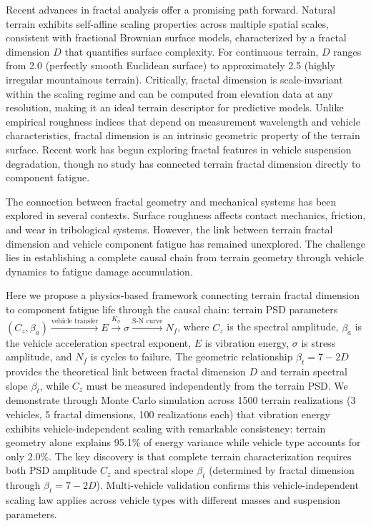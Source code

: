\documentclass[11pt]{article}
\begin{document}
Recent advances in fractal analysis offer a promising path forward. Natural terrain exhibits self-affine scaling properties across multiple spatial scales\cite{Mandelbrot1982,Sayles1978,Persson2005}, consistent with fractional Brownian surface models\cite{MandelbrotVanNess1968,Mandelbrot1982}, characterized by a fractal dimension $D$ that quantifies surface complexity. For continuous terrain, $D$ ranges from 2.0 (perfectly smooth Euclidean surface) to approximately 2.5 (highly irregular mountainous terrain). Critically, fractal dimension is scale-invariant within the scaling regime and can be computed from elevation data at any resolution, making it an ideal terrain descriptor for predictive models. Unlike empirical roughness indices that depend on measurement wavelength and vehicle characteristics, fractal dimension is an intrinsic geometric property of the terrain surface. Recent work has begun exploring fractal features in vehicle suspension degradation\cite{Braut2023}, though no study has connected terrain fractal dimension directly to component fatigue.

The connection between fractal geometry and mechanical systems has been explored in several contexts. Surface roughness affects contact mechanics, friction, and wear in tribological systems\cite{Persson2005}. However, the link between terrain fractal dimension and vehicle component fatigue has remained unexplored. The challenge lies in establishing a complete causal chain from terrain geometry through vehicle dynamics to fatigue damage accumulation.

Here we propose a physics-based framework connecting terrain fractal dimension to component fatigue life through the causal chain: terrain PSD parameters $(C_z, \beta_a) \xrightarrow{\text{vehicle transfer}} E \xrightarrow{K_\sigma} \sigma \xrightarrow{\text{S-N curve}} N_f$, where $C_z$ is the spectral amplitude, $\beta_a$ is the vehicle acceleration spectral exponent, $E$ is vibration energy, $\sigma$ is stress amplitude, and $N_f$ is cycles to failure. The geometric relationship $\beta_t = 7-2D$ provides the theoretical link between fractal dimension $D$ and terrain spectral slope $\beta_t$, while $C_z$ must be measured independently from the terrain PSD. We demonstrate through Monte Carlo simulation across 1500 terrain realizations (3 vehicles, 5 fractal dimensions, 100 realizations each) that vibration energy exhibits vehicle-independent scaling with remarkable consistency: terrain geometry alone explains 95.1\% of energy variance while vehicle type accounts for only 2.0\%. The key discovery is that complete terrain characterization requires both PSD amplitude $C_z$ and spectral slope $\beta_t$ (determined by fractal dimension through $\beta_t = 7-2D$). Multi-vehicle validation confirms this vehicle-independent scaling law applies across vehicle types with different masses and suspension parameters.
\end{document}
